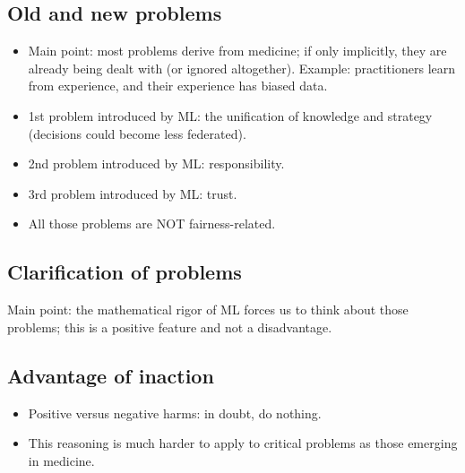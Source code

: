 \subsection{Old and new problems}
\begin{itemize}
    \item Main point: most problems derive from medicine;
        if only implicitly, they are already being dealt with (or ignored altogether).
        Example: practitioners learn from experience, and their experience has biased data.
    \item 1st problem introduced by ML: the unification of knowledge and strategy (decisions could become less federated).
    \item 2nd problem introduced by ML: responsibility.
    \item 3rd problem introduced by ML: trust.
    \item All those problems are NOT fairness-related.
\end{itemize}

\subsection{Clarification of problems}
Main point: the mathematical rigor of ML forces us to think about those problems; this is a positive feature and not a disadvantage.

\subsection{Advantage of inaction}
\begin{itemize}
    \item Positive versus negative harms: in doubt, do nothing.
    \item This reasoning is much harder to apply to critical problems as those emerging in medicine.
\end{itemize}
